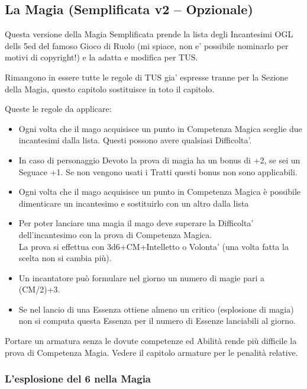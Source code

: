 \subsection{La Magia (Semplificata v2 -- Opzionale)}

\begin{multicols}{2}

Questa versione della Magia Semplificata prende la lista degli Incantesimi OGL dells 5ed del famoso Gioco di Ruolo (mi spiace, non e' possibile nominarlo per motivi di copyright!) e la adatta e modifica per TUS.


Rimangono in essere tutte le regole di TUS gia' espresse tranne per la Sezione della Magia, questo capitolo sostituisce in toto il capitolo.

Queste le regole da applicare:\\
\begin{itemize}

\item 
Ogni volta che il mago acquisisce un punto in Competenza Magica sceglie due incantesimi dalla lista. Questi possono avere qualsiasi Difficolta'.
\item 
In caso di personaggio Devoto la prova di magia ha un bonus di +2, se sei un Seguace +1.
Se non vengono usati i Tratti questi bonus non sono applicabili.
\item
Ogni volta che il mago acquisisce un punto in Competenza Magica è possibile dimenticare un incantesimo e sostituirlo con un altro dalla lista
\item 
Per poter lanciare una magia il mago deve superare la Difficolta' dell'incantesimo con la prova di Competenza Magica.\\
La prova si effettua con 3d6+CM+Intelletto o Volonta' (una volta fatta la scelta non si cambia più).
\item 
Un incantatore può formulare nel giorno un numero di magie pari a (CM/2)+3.
\item 
Se nel lancio di una Essenza ottiene almeno un critico (esplosione di magia) non si computa questa Essenza per il numero di Essenze lanciabili al giorno.
\end{itemize}

Portare un armatura senza le dovute competenze ed Abilità rende più difficile la prova di Competenza Magia. Vedere il capitolo armature per le penalità relative.

\subsubsection{L'esplosione del 6 nella Magia}


\end{multicols}
